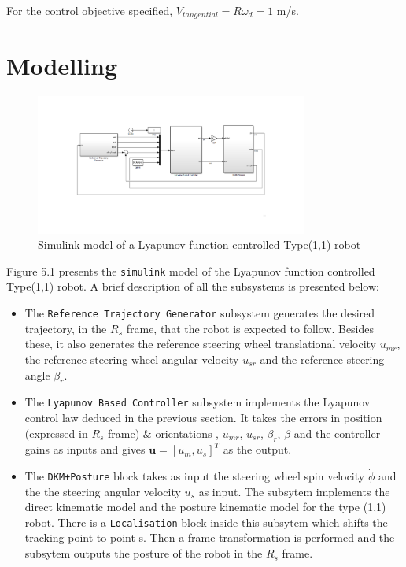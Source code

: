 \documentclass{article}
\begin{document}
For the control objective specified, $V_{tangential}=R\omega_{d}=1$ m/s.
\section{Modelling}
\begin{figure}[H]
\centering
\includegraphics[width = 0.8\textwidth]{Figures/figure2.png}
\caption{Simulink model of a Lyapunov function  controlled Type(1,1) robot}
\label{fig:figure2}
\end{figure}
Figure 5.1 presents the \texttt{simulink} model of the Lyapunov function controlled Type(1,1) robot. A brief description of all the subsystems is presented below:\\

\begin{itemize}
\item The \texttt{Reference Trajectory Generator} subsystem generates the desired trajectory, in the $R_s$ frame, that the robot is expected to follow. Besides these, it also generates the reference steering wheel translational velocity $u_{mr}$, the reference steering wheel angular velocity $u_{sr}$ and the reference steering angle $\beta_{r}$.
\item The \texttt{Lyapunov Based Controller} subsystem implements the Lyapunov control law deduced in the previous section. It takes the errors in position (expressed in $R_s$ frame) \& orientations , $u_{mr}$, $u_{sr}$, $\beta_{r}$, $\beta$ and the controller gains as inputs and gives $\textbf{u}=[u_m,u_s]^T$ as the output.
\item The \texttt{DKM+Posture} block takes as input the steering wheel spin velocity $\dot{\phi}$ and the the steering angular velocity  $u_s$ as input. The subsytem implements the direct kinematic model and the posture kinematic model for the type (1,1) robot. There is a \texttt{Localisation} block inside this subsytem which shifts the tracking point to point s. Then a frame transformation is performed and the subsytem outputs the posture of the robot in the $R_s$ frame.
\end{itemize} 
\end{document}
